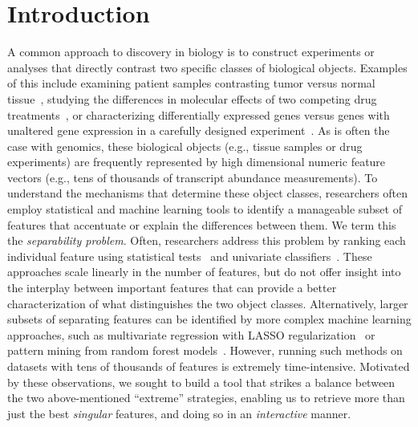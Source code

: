 
\section{Introduction}
\label{sec:intro}


A common approach to discovery in biology
is to construct experiments or analyses that directly
contrast two specific classes of biological objects.
Examples of this include examining patient samples
contrasting tumor versus normal tissue~\cite{tang2017gepia},
studying the differences in molecular effects
of two competing drug treatments~\cite{lamb2006connectivity},
or characterizing differentially expressed genes
versus genes with unaltered gene expression
in a carefully designed experiment~\cite{liberzon2015molecular}.
As is often the case with genomics, these
biological objects (e.g., tissue samples or drug experiments)
are frequently represented by high dimensional
numeric feature vectors (e.g., tens of thousands of transcript abundance measurements).
To understand the mechanisms that determine
these object classes,
researchers often employ statistical and
machine learning tools to identify a
manageable subset of features that
accentuate or explain the differences between them.
We term this the {\em separability problem}.
Often, researchers address this problem
by ranking each individual feature
using statistical tests~\cite{dudoit2002statistical}
and univariate classifiers~\cite{lai2006comparison}.
These approaches scale linearly in the number of features,
but do not offer insight into the interplay
between important features that can provide a better
characterization of what
distinguishes the two object classes.
Alternatively, larger subsets of separating
features can be identified by more complex
machine learning approaches, such as multivariate
regression with LASSO regularization~\cite{peng2010regularized}
or pattern mining from random forest models~\cite{breiman2001random}.
However, running such methods on datasets with
tens of thousands of features is extremely time-intensive.
Motivated by these observations,
we sought to build a tool that strikes a balance between the
two above-mentioned ``extreme''
strategies, enabling us to retrieve more than just the best {\em singular} features, and doing so in an {\em interactive} manner.

